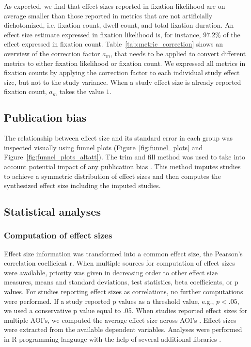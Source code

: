 \documentclass[english,natbib,man,floatsintext]{apa6}
\begin{document}
As expected, we find that effect sizes reported in fixation likelihood are on average smaller than those reported in metrics that are not artificially dichotomized, i.e. fixation count, dwell count, and total fixation duration. An effect size estimate expressed in fixation likelihood is, for instance, $97.2\%$ of the effect expressed in fixation count. Table~\ref{tab:metric_correction} shows an overview of the correction factor $a_m$, that needs to be applied to convert different metrics to either fixation likelihood or fixation count. We expressed all metrics in fixation counts by applying the correction factor to each individual study effect size, but not to the study variance. When a study effect size is already reported fixation count, $a_m$ takes the value $1$.  


\subsection{Publication bias}

The relationship between effect size and its standard error in each group was inspected visually using funnel plots (Figure~\ref{fig:funnel_plots} and Figure~\ref{fig:funnel_plots_altatt}). The trim and fill method was used to take into account potential impact of any publication bias \citep{duval2000trim}. This method imputes studies to achieve a symmetric distribution of effect sizes and then computes the synthesized effect size including the imputed studies.


\subsection{Statistical analyses}

\subsubsection{Computation of effect sizes}

Effect size information was transformed into a common effect size, the Pearson’s correlation coefficient r. When multiple sources for computation of effect sizes were available, priority was given in decreasing order to other effect size measures, means and standard deviations, test statistics, beta coefficients, or p values. For studies reporting effect sizes as correlations, no further computations were performed. If a study reported p values as a threshold value, e.g., $p < .05$, we used a conservative p value equal to .05. When studies reported effect sizes for multiple AOI's, we computed the average effect size across AOI's \citep[for a similar approach, see][]{chita2016attention}. Effect sizes were extracted from the available dependent variables. Analyses were performed in R programming language with the help of several additional libraries \citep{R2020,del2012a,datatable,ggplot2,metafor}.
\end{document}
